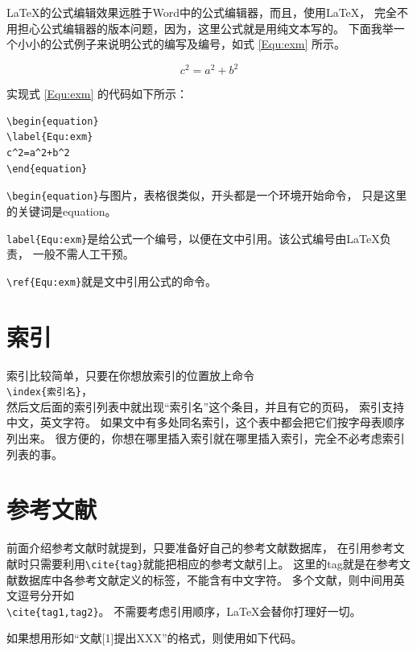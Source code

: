 \LaTeX 的公式编辑效果远胜于Word中的公式编辑器，而且，使用LaTeX，
完全不用担心公式编辑器的版本问题，因为，这里公式就是用纯文本写的。
下面我举一个小小的公式例子来说明公式的编写及编号，如式 \ref{Equ:exm} 所示。

\begin{equation}
\label{Equ:exm}
c^2=a^2+b^2
\end{equation}

实现式 \ref{Equ:exm} 的代码如下所示：

{
\linespread{1}
\noindent
\begin{verbatim}
\begin{equation}
\label{Equ:exm}
c^2=a^2+b^2
\end{equation}
\end{verbatim}
}

\verb+\begin{equation}+与图片，表格很类似，开头都是一个环境开始命令，
只是这里的关键词是equation。

\verb+label{Equ:exm}+是给公式一个编号，以便在文中引用。该公式编号由\LaTeX 负责，
一般不需人工干预。

\verb+\ref{Equ:exm}+就是文中引用公式的命令。

\section{索引}

索引比较简单，只要在你想放索引的位置放上命令\\
\verb+\index{索引名}+，\\
然后文后面的索引列表中就出现“索引名”这个条目，并且有它的页码，
索引支持中文，英文字符。
如果文中有多处同名索引，这个表中都会把它们按字母表顺序列出来。
很方便的，你想在哪里插入索引就在哪里插入索引，完全不必考虑索引列表的事。

\section{参考文献}

前面介绍参考文献时就提到，只要准备好自己的参考文献数据库，
在引用参考文献时只需要利用\verb+\cite{tag}+就能把相应的参考文献引上。
这里的tag就是在参考文献数据库中各参考文献定义的标签，不能含有中文字符。
多个文献，则中间用英文逗号分开如\\
\verb+\cite{tag1,tag2}+。
不需要考虑引用顺序，\LaTeX 会替你打理好一切。

如果想用形如“文献[1]提出XXX”的格式，则使用如下代码。

